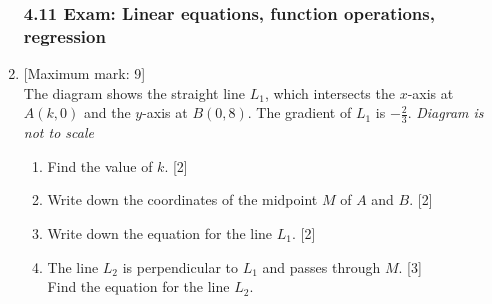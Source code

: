 \documentclass[12pt, twoside]{article}
\begin{document}
\begin{enumerate}
    \subsubsection*{4.11 Exam: Linear equations, function operations, regression}

    \item {[Maximum mark: 9]} \\[0.3cm]
    The diagram shows the straight line $L_1$, which intersects the $x$-axis at $A(k, 0)$ and the $y$-axis at $B(0,8)$. The gradient of $L_1$ is $-\frac{2}{3}$. \hfill \emph{Diagram is not to scale}
        \begin{center}
        \end{center}
        \begin{enumerate}%
            \item Find the value of $k$. \hfill [2]
            \item Write down the coordinates of the midpoint $M$ of $A$ and $B$. \hfill [2]
            \item Write down the equation for the line $L_1$. \hfill [2]
            \item The line $L_2$ is perpendicular to $L_1$ and passes through $M$. \hfill [3]\\[0.2cm]
            Find the equation for the line $L_2$.
        \end{enumerate}


\end{enumerate}
\end{document}
